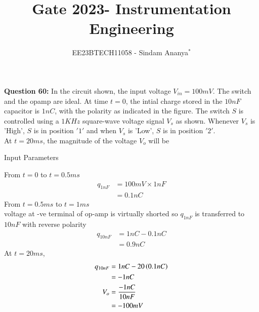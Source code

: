 \documentclass[journal,12pt,twocolumn]{IEEEtran}
\theoremstyle{remark}
\begin{document}

\vspace{3cm}

\title{Gate 2023- Instrumentation Engineering}
\author{EE23BTECH11058 - Sindam Ananya$^{*}$%
}
\maketitle
\newpage
\bigskip

\renewcommand{\thefigure}{\theenumi}
\renewcommand{\thetable}{\theenumi}

\vspace{3cm}
\textbf{Question 60:} 
In the circuit shown, the input voltage $V_{in} = 100mV$. The switch and the opamp are ideal. At time $t=0$, the intial charge stored in the $10nF$ capacitor is $1nC$, with the polarity as indicated in the figure. The switch $S$ is controlled using a $1KHz$ square-wave voltage signal $V_s$ as shown. Whenever $V_s$ is 'High', $S$ is in position $'1'$ and when $V_s$ is 'Low', $S$ is in position $'2'$.\\
At $t = 20ms$, the magnitude of the voltage $V_o$ will be  \\  
\solution
\begin{table}[h!]
    \centering
    
    \caption{Input Parameters}
    \label{tab:gatein60table}
\end{table}
From $t = 0$ to $t = 0.5ms$\\
\begin{align}
q_{1nF} &= 100mV \times 1nF\\ 
        &= 0.1nC
\end{align}
From $t = 0.5ms$ to $t = 1ms$\\
voltage at -ve terminal of op-amp is virtually shorted so $q_{1nF}$ is transferred to $10nF$ with reverse polarity\\
\begin{align}
q_{10nF} &= 1nC - 0.1nC\\
         &= 0.9nC
\end{align}
At $t = 20ms$,
\begin{align}
q_{10nF} &= 1nC - 20 \left(0.1nC\right)\\
         &= -1nC\\
V_o &= \frac{-1nC}{10nF}\\
    &= -100mV
\end{align}
\end{document}
